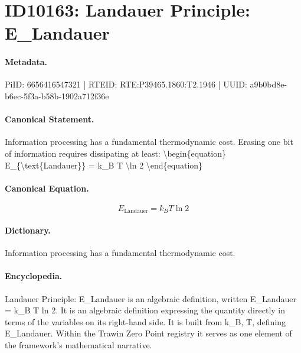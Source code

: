 \section*{ID10163: Landauer Principle: E\_Landauer}
\paragraph{Metadata.}
PiID: 6656416547321 | RTEID: RTE:P39465.1860:T2.1946 | UUID: a9b0bd8e-b6ec-5f3a-b58b-1902a712f36e

\paragraph{Canonical Statement.}
Information processing has a fundamental thermodynamic cost. Erasing one bit of information requires dissipating at least: \textbackslash{}begin\{equation\} E\_\{\textbackslash{}text\{Landauer\}\} = k\_B T \textbackslash{}ln 2 \textbackslash{}end\{equation\}

\paragraph{Canonical Equation.}
\[
E_{\text{Landauer}} = k_B T \ln 2
\]

\paragraph{Dictionary.}
Information processing has a fundamental thermodynamic cost.

\paragraph{Encyclopedia.}
Landauer Principle: E\_Landauer is an algebraic definition, written E\_Landauer = k\_B T ln 2. It is an algebraic definition expressing the quantity directly in terms of the variables on its right-hand side. It is built from k\_B, T, defining E\_Landauer. Within the Trawin Zero Point registry it serves as one element of the framework's mathematical narrative.
